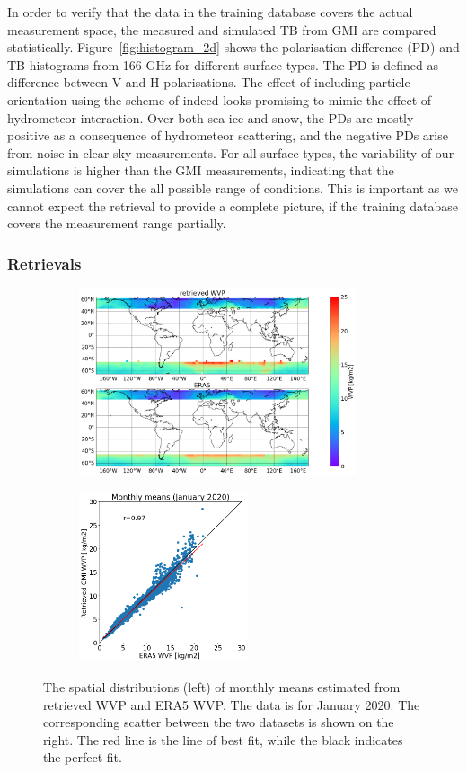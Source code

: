 \documentclass[12pt,oneside,a4paper]{article}
\begin{document}
In order to verify that the data in the training database covers the actual measurement space, the measured and simulated TB from GMI are compared statistically. Figure~\ref{fig:histogram_2d} shows the polarisation difference (PD) and TB histograms from 166 GHz for different surface types. The PD is defined as difference between V and H polarisations. The effect of including particle orientation using the scheme of \citep{baralakas:intro:21} indeed looks promising to mimic the effect of hydrometeor interaction.
Over both sea-ice and snow, the PDs are mostly positive as a consequence of hydrometeor scattering, and the negative PDs arise from noise in clear-sky measurements. For all surface types, the variability of our simulations is higher than the GMI measurements, indicating that the simulations can cover the all possible range of conditions. This is important as we cannot expect the retrieval to provide a complete picture, if the training database covers the measurement range partially.

\subsubsection{Retrievals}

\begin{figure}[t]
	\centering
	\begin{subfigure}{.54\textwidth}
		\includegraphics[height = 55mm]{Figures/WVP_spatial_jan2020.png}
	\end{subfigure}
	\begin{subfigure}{.34\textwidth}
	\includegraphics[height = 50mm]{Figures/WVP_scatter_monthlymean.png} 
	\end{subfigure}
	\caption{The spatial distributions (left) of monthly means estimated from retrieved WVP and ERA5 WVP. The data is for January 2020. The corresponding scatter between the two datasets is shown on the right. The red line is the line of best fit, while the black indicates the perfect fit.}
	\label{fig:WVP_retrievals}
\end{figure}
\end{document}
